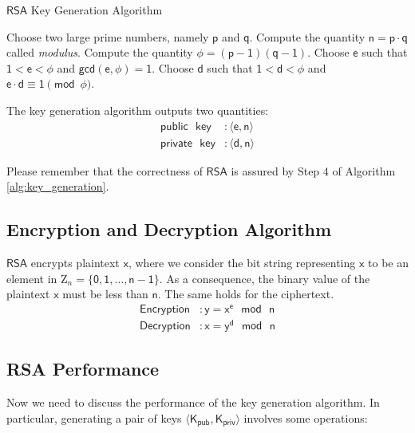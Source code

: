 \documentclass{article}
\begin{document}
\begin{algorithm}
\caption{$\mathsf{RSA}$ Key Generation Algorithm}
\label{alg:key_generation}
\begin{algorithmic}[1]
    \State Choose two large prime numbers, namely $\mathsf{p}$ and $\mathsf{q}$.
    \State Compute the quantity $\mathsf{n = p \cdot q}$ called \textit{modulus}.
    \State Compute the quantity $\mathsf{\phi = (p-1)(q-1)}$.
    \State Choose $\mathsf{e}$ such that $\mathsf{1 < e < \phi}$ and $\mathsf{gcd(e, \phi) = 1}$.
    \State Choose $\mathsf{d}$ such that $\mathsf{1 < d  < \phi}$ and $\mathsf{e \cdot d \equiv 1 \pmod{\phi}}$.
\end{algorithmic}
\end{algorithm}

\par \noindent The key generation algorithm outputs two quantities:
\begin{align*}
    \mathsf{public} \text{ } \mathsf{key} &: \mathsf{\langle e, n \rangle} \\
    \mathsf{private} \text{ } \mathsf{key} &: \mathsf{\langle d, n \rangle} 
\end{align*}

\par \noindent Please remember that the correctness of $\mathsf{RSA}$ is assured by Step 4 of Algorithm \ref{alg:key_generation}.

\subsection{Encryption and Decryption Algorithm} 
$\mathsf{RSA}$ encrypts plaintext $\mathsf{x}$, where we consider the bit string representing $\mathsf{x}$ to be an element in $\mathrm{Z}_{n} = \mathsf{\{0, 1, \dots, n - 1\}}$. As a consequence, the binary value of the plaintext $\mathsf{x}$ must be less than $\mathsf{n}$. The same holds for the ciphertext.
\begin{align*}
    \mathsf{Encryption} &: \mathsf{y = x^{e} \text{ } mod \text{ } n} \\
    \mathsf{Decryption} &: \mathsf{x = y^{d} \text{ } mod \text{ } n}
\end{align*}

\subsection{RSA Performance}
\par Now we need to discuss the performance of the key generation algorithm. In particular, generating a pair of keys $\mathsf{\langle K_{pub}, K_{priv} \rangle}$ involves some operations:
\end{document}
